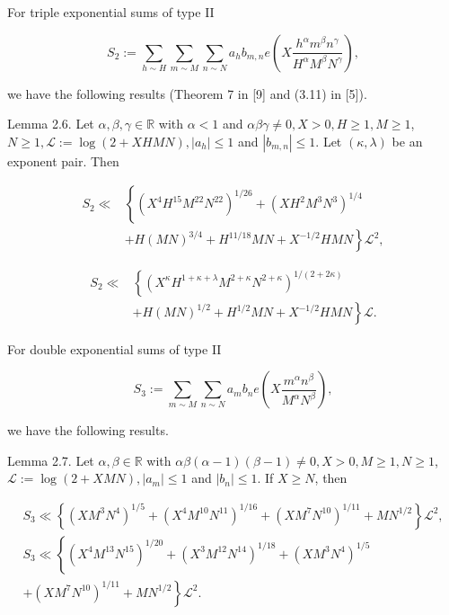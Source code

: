 \documentclass[10pt]{article}
\begin{document}
For triple exponential sums of type II

$$
S_{2}:=\sum_{h \sim H} \sum_{m \sim M} \sum_{n \sim N} a_{h} b_{m, n} e\left(X \frac{h^{\alpha} m^{\beta} n^{\gamma}}{H^{\alpha} M^{\beta} N^{\gamma}}\right),
$$

we have the following results (Theorem 7 in [9] and (3.11) in [5]).

Lemma 2.6. Let $\alpha, \beta, \gamma \in \mathbb{R}$ with $\alpha<1$ and $\alpha \beta \gamma \neq 0, X>0, H \geqslant 1, M \geqslant 1$, $N \geqslant 1, \mathscr{L}:=\log (2+X H M N),\left|a_{h}\right| \leqslant 1$ and $\left|b_{m, n}\right| \leqslant 1$. Let $(\kappa, \lambda)$ be an exponent pair. Then


\begin{align*}
S_{2} \ll & \left\{\left(X^{4} H^{15} M^{22} N^{22}\right)^{1 / 26}+\left(X H^{2} M^{3} N^{3}\right)^{1 / 4}\right. \\
& \left.+H(M N)^{3 / 4}+H^{11 / 18} M N+X^{-1 / 2} H M N\right\} \mathscr{L}^{2}, \tag{2.14}
\end{align*}



\begin{align*}
S_{2} \ll & \left\{\left(X^{\kappa} H^{1+\kappa+\lambda} M^{2+\kappa} N^{2+\kappa}\right)^{1 /(2+2 \kappa)}\right. \\
& \left.+H(M N)^{1 / 2}+H^{1 / 2} M N+X^{-1 / 2} H M N\right\} \mathscr{L} . \tag{2.15}
\end{align*}


For double exponential sums of type II

$$
S_{3}:=\sum_{m \sim M} \sum_{n \sim N} a_{m} b_{n} e\left(X \frac{m^{\alpha} n^{\beta}}{M^{\alpha} N^{\beta}}\right),
$$

we have the following results.

Lemma 2.7. Let $\alpha, \beta \in \mathbb{R}$ with $\alpha \beta(\alpha-1)(\beta-1) \neq 0, X>0, M \geqslant 1, N \geqslant 1$, $\mathscr{L}:=\log (2+X M N),\left|a_{m}\right| \leqslant 1$ and $\left|b_{n}\right| \leqslant 1$. If $X \geqslant N$, then


\begin{gather*}
S_{3} \ll\left\{\left(X M^{3} N^{4}\right)^{1 / 5}+\left(X^{4} M^{10} N^{11}\right)^{1 / 16}+\left(X M^{7} N^{10}\right)^{1 / 11}+M N^{1 / 2}\right\} \mathscr{L}^{2},  \tag{2.16}\\
S_{3} \ll\left\{\left(X^{4} M^{13} N^{15}\right)^{1 / 20}+\left(X^{3} M^{12} N^{14}\right)^{1 / 18}+\left(X M^{3} N^{4}\right)^{1 / 5}\right. \\
\left.+\left(X M^{7} N^{10}\right)^{1 / 11}+M N^{1 / 2}\right\} \mathscr{L}^{2} . \tag{2.17}
\end{gather*}
\end{document}
